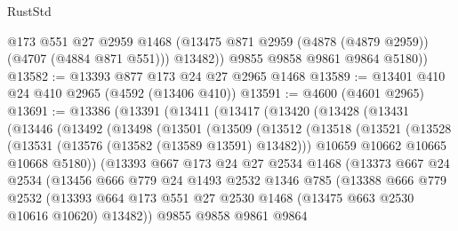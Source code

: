 \begin{lexlean}{RustStd}
\begin{coremodule}
            @173
            @551
            @27
            @2959
            @1468
            (@13475 @871 @2959 (@4878 (@4879 @2959)) (@4707 (@4884 @871 @551)))
            @13482))
        @9855
        @9858
        @9861
        @9864
        @5180))
@13582 := @13393 @877 @173 @24 @27 @2965 @1468
@13589 := @13401 @410 @24 @410 @2965 (@4592 (@13406 @410))
@13591 := @4600 (@4601 @2965)
@13691 := @13386
    (@13391
      (@13411
        (@13417
          (@13420
            (@13428
              (@13431
                (@13446
                  (@13492
                    (@13498
                      (@13501
                        (@13509
                          (@13512
                            (@13518
                              (@13521
                                (@13528
                                  (@13531 (@13576 (@13582 (@13589 @13591) @13482)))
                                  @10659
                                  @10662
                                  @10665
                                  @10668
                                  @5180))
                              (@13393
                                @667
                                @173
                                @24
                                @27
                                @2534
                                @1468
                                (@13373
                                  @667
                                  @24
                                  @2534
                                  (@13456
                                    @666
                                    @779
                                    @24
                                    @1493
                                    @2532
                                    @1346
                                    @785
                                    (@13388
                                      @666
                                      @779
                                      @2532
                                      (@13393
                                        @664
                                        @173
                                        @551
                                        @27
                                        @2530
                                        @1468
                                        (@13475 @663 @2530 @10616 @10620)
                                        @13482))
                                    @9855
                                    @9858
                                    @9861
                                    @9864

\end{coremodule}
\end{lexlean}
